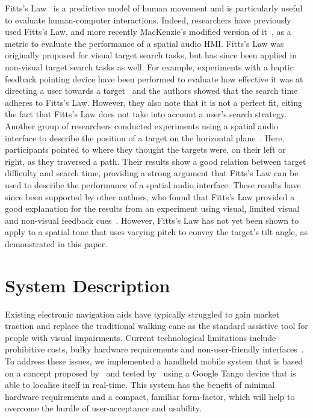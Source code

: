 \documentclass[acmsmall]{acmart}
\begin{document}
Fitts's Law~\citep{fitts1954information} is a predictive model of human movement and is particularly useful to evaluate human-computer interactions.
Indeed, researchers have previously used Fitts's Law, and more recently MacKenzie's modified version of it~\citep{mackenzie1992fitts}, as a metric to evaluate the performance of a spatial audio HMI\@.
Fitts's Law was originally proposed for visual target search tasks, but has since been applied in non-visual target search tasks as well.
For example, experiments with a haptic feedback pointing device have been performed to evaluate how effective it was at directing a user towards a target~\citep{ahmaniemi2009augmented} and the authors showed that the search time adheres to Fitts's Law.
However, they also note that it is not a perfect fit, citing the fact that Fitts's Law does not take into account a user's search strategy.
Another group of researchers conducted experiments using a spatial audio interface to describe the position of a target on the horizontal plane~\citep{marentakis2006effects}.
Here, participants pointed to where they thought the targets were, on their left or right, as they traversed a path.
Their results show a good relation between target difficulty and search time, providing a strong argument that Fitts's Law can be used to describe the performance of a spatial audio interface.
These results have since been supported by other authors, who found that Fitts's Law provided a good explanation for the results from an experiment using visual, limited visual and non-visual feedback cues~\citep{wu2010fitts}.
However, Fitts's Law has not yet been shown to apply to a spatial tone that uses varying pitch to convey the target's tilt angle, as demonstrated in this paper.

\section{System Description}\label{sec:system-description}

Existing electronic navigation aids have typically struggled to gain market traction and replace the traditional walking cane as the standard assistive tool for people with visual impairments.
Current technological limitations include prohibitive costs, bulky hardware requirements and non-user-friendly interfaces~\citep{golledge2004stated,yusif2016older,arditi2013user}.
To address these issues, we implemented a handheld mobile system that is based on a concept proposed by~\cite{lock2019active} and tested by~\cite{lock2019bone} using a Google Tango device that is able to localise itself in real-time.
This system has the benefit of minimal hardware requirements and a compact, familiar form-factor, which will help to overcome the hurdle of user-acceptance and usability.
\end{document}
